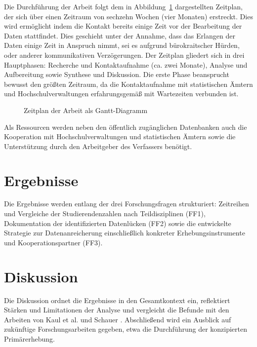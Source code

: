 Die Durchführung der Arbeit folgt dem in Abbildung~\ref{fig:gantt} dargestellten Zeitplan, der sich über einen Zeitraum von sechzehn Wochen (vier Monaten) erstreckt. Dies wird ermöglicht indem die Kontakt bereits einige Zeit vor der Bearbeitung der Daten stattfindet. Dies geschieht unter der Annahme, dass das Erlangen der Daten einige Zeit in Anspruch nimmt, sei es aufgrund bürokraitscher Hürden, oder anderer kommunikativen Verzögerungen. Der Zeitplan gliedert sich in drei Hauptphasen: Recherche und Kontaktaufnahme (ca. zwei Monate), Analyse und Aufbereitung sowie Synthese und Diskussion. Die erste Phase beansprucht bewusst den größten Zeitraum, da die Kontaktaufnahme mit statistischen Ämtern und Hochschulverwaltungen erfahrungsgemäß mit Wartezeiten verbunden ist.

\begin{figure}[ht]
    \centering
    \resizebox{\textwidth}{!}{
        
    }
    \caption{Zeitplan der Arbeit als Gantt-Diagramm}
    \label{fig:gantt}
\end{figure}

Als Ressourcen werden neben den öffentlich zugänglichen Datenbanken auch die Kooperation mit Hochschulverwaltungen und statistischen Ämtern sowie die Unterstützung durch den Arbeitgeber des Verfassers benötigt.

\section{Ergebnisse}

Die Ergebnisse werden entlang der drei Forschungsfragen strukturiert: Zeitreihen und Vergleiche der Studierendenzahlen nach Teildisziplinen (FF1), Dokumentation der identifizierten Datenlücken (FF2) sowie die entwickelte Strategie zur Datenanreicherung einschließlich konkreter Erhebungsinstrumente und Kooperationspartner (FF3).

\section{Diskussion}

Die Diskussion ordnet die Ergebnisse in den Gesamtkontext ein, reflektiert Stärken und Limitationen der Analyse und vergleicht die Befunde mit den Arbeiten von Kaul et al. \cite{kaulKarrierestart2016} und Schauer \cite{schauerWirtschaftsinformatik2021}. Abschließend wird ein Ausblick auf zukünftige Forschungsarbeiten gegeben, etwa die Durchführung der konzipierten Primärerhebung.

